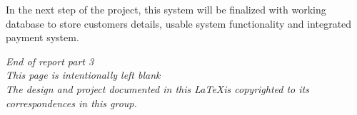 \documentclass[12pt, a4paper]{article}
\theoremstyle{styleth}
\theoremstyle{styledef}
\begin{document}
In the next step of the project, this system will be finalized with working database to store customers details, usable system functionality and integrated payment system.

\newpage
\thispagestyle{empty}
\vspace*{\fill}
\centering
\textit{End of report part 3}\\
\textit{This page is intentionally left blank} \\
\textit{The design and project documented in this \LaTeX is copyrighted to its correspondences in this group.}
\end{document}
